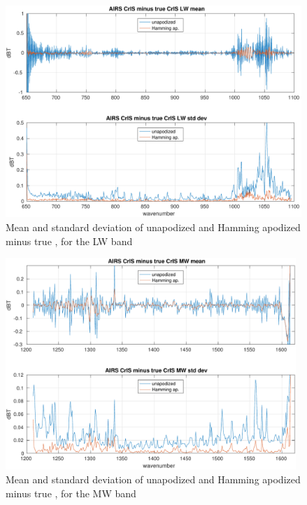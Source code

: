 \documentclass[12pt]{article}
\begin{document}
\begin{figure} %
  \centering
  \includegraphics[height=8cm]{figures/a2cris_diff_LW.pdf}
  \caption{Mean and standard deviation of unapodized and Hamming
    apodized {\airs} {\cris} minus true {\cris}, for the {\cris} LW
    band}
  \label{aclwd}
\end{figure}

\begin{figure} %
  \centering
  \includegraphics[height=8cm]{figures/a2cris_diff_MW.pdf}
  \caption{Mean and standard deviation of unapodized and Hamming
    apodized {\airs} {\cris} minus true {\cris}, for the {\cris} MW
    band}
  \label{aclwd}
\end{figure}
\end{document}
